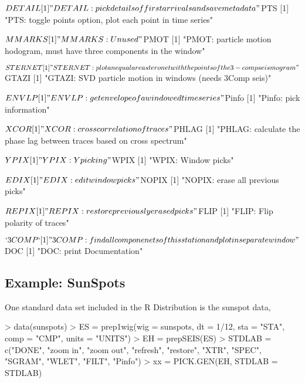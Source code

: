 \documentclass{article}
\begin{document}
\begin{Schunk}
\begin{Soutput}
$DETAIL
[1] "DETAIL: pick details of first arrivals and save meta data"

$PTS
[1] "PTS: toggle points option, plot each point in time series"

$MMARKS
[1] "MMARKS: Unused"

$PMOT
[1] "PMOT: particle motion hodogram, must have three components in the window"

$STERNET
[1] "STERNET: plot an equal area steronet with the points of the 3-comp seismogram"

$GTAZI
[1] "GTAZI: SVD particle motion in windows (needs 3Comp seis)"

$ENVLP
[1] "ENVLP: get envelope of a windowed time series"

$Pinfo
[1] "Pinfo: pick information"

$XCOR
[1] "XCOR: cross correlation of traces"

$PHLAG
[1] "PHLAG: calculate the phase lag between traces based on cross spectrum"

$YPIX
[1] "YPIX: Y picking"

$WPIX
[1] "WPIX: Window picks"

$EDIX
[1] "EDIX: edit window picks"

$NOPIX
[1] "NOPIX: erase all previous picks"

$REPIX
[1] "REPIX: restore previously erased picks"

$FLIP
[1] "FLIP: Flip polarity of traces"

$`3COMP`
[1] "3COMP: find all componenets of this station and plot in separate window"

$DOC
[1] "DOC: print Documentation"
\end{Soutput}
\end{Schunk}


\subsection{Example: SunSpots}

One standard data set included in the R
Distribution is the 
sunspot data,
\begin{Schunk}
\begin{Sinput}
> data(sunspots)
> ES = prep1wig(wig = sunspots, dt = 1/12, sta = "STA", comp = "CMP", 
     units = "UNITS")
> EH = prepSEIS(ES)
> STDLAB = c("DONE", "zoom in", "zoom out", "refresh", "restore", 
     "XTR", "SPEC", "SGRAM", "WLET", "FILT", "Pinfo")
> xx = PICK.GEN(EH, STDLAB = STDLAB)
\end{Sinput}
\end{Schunk}
\end{document}
